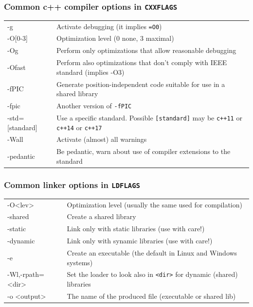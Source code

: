 \documentclass[10pt,aspectratio=169]{beamer}
\begin{document}
\begin{frame}
  \frametitle{Common c++ compiler options in \texttt{CXXFLAGS}}
 \hspace*{-0.5cm}
  \begin{tabular}{>{\ttfamily}l|p{}}
    -g & Activate debugging (it implies \texttt{=O0})\\
    -O[0-3]& Optimization level (0 none, 3 maximal)\\
    -Og & Perform only optimizations that allow reasonable debugging\\
    -Ofast & Perform also optimizations that don't comply with IEEE standard
    (implies -O3)\\
    -fPIC &  Generate position-independent code suitable for use in a
            shared library\\
    -fpic & Another version of \texttt{-fPIC}\\
    -std=[standard] & Use a specific standard. Possible
                      \texttt{[standard]} may be
                      \texttt{c++11} or \texttt{c++14} or \texttt{c++17}\\
    -Wall & Activate (almost) all warnings\\
    -pedantic & Be pedantic, warn about use of  compiler extensions to the
                standard\\
  \end{tabular}  
\end{frame}


\begin{frame}
  \frametitle{Common linker  options in \texttt{LDFLAGS}}
 \hspace*{-0.5cm}
  \begin{tabular}{>{\ttfamily}l|p{}}
    -O<lev>& Optimization level (usually the same used for compilation)\\
    -shared & Create a shared library\\
    -static & Link only with static libraries (use with care!)\\
    -dynamic & Link only with synamic libraries (use with care!)\\
    -e & Create an executable (the default in Linux and Windows  systems)\\
    -Wl,-rpath=<dir>& Set the loader to look also in \texttt{<dir>} for dynamic (shared) libraries\\
    -o <output>& The name of the produced file (executable or shared lib)
  \end{tabular}  
\end{frame}
\end{document}
